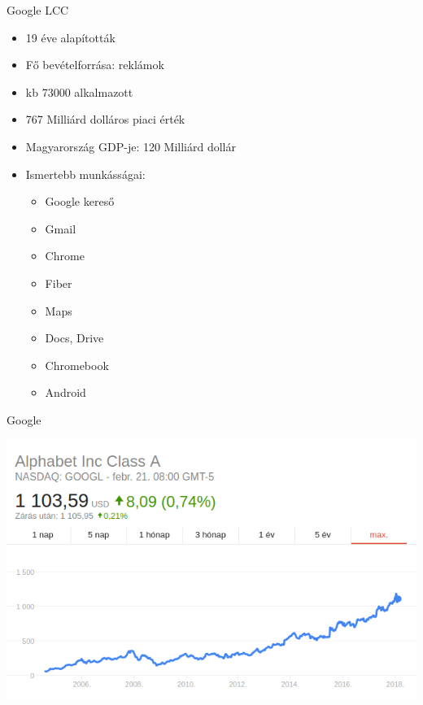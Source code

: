 \documentclass{beamer}
\begin{document}
\begin{frame}[fragile]{Google LCC}
	\begin{minipage}{0.49\textwidth}
		\begin{itemize}
				\item 19 éve alapították
				\item Fő bevételforrása: reklámok
				\item kb 73000 alkalmazott
				\item 767 Milliárd dolláros piaci érték
				\item Magyarország GDP-je: 120 Milliárd dollár 
		\end{itemize}
	\end{minipage}
\begin{minipage}{0.49\textwidth}
	\begin{itemize}
		\item Ismertebb munkásságai:
		\begin{itemize}
			\item Google kereső
			\item Gmail
			\item Chrome
			\item Fiber
			\item Maps
			\item Docs, Drive
			\item Chromebook
			\item Android
		\end{itemize}
	\end{itemize}
\end{minipage}
\end{frame}
\begin{frame}[fragile]{Google}
	\begin{minipage}{0.8\textwidth}
		\includegraphics[width=1 \linewidth]{figures/share.png}
	\end{minipage}
\end{frame}
\end{document}
